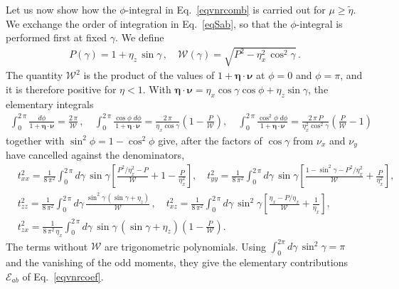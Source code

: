 \documentclass[aps,prb,onecolumn,nofootinbib,citeautoscript,10pt]{revtex4-2}
\newcommand{\bs}[1]{\boldsymbol{#1}}
\def \nn{\nonumber \\}
\begin{document}
Let us now show how the $\phi$-integral in Eq.~\eqref{eqvnrcomb} is carried out for $\mu\ge\tilde\eta$. We exchange the order of integration in Eq.~\eqref{eqSab}, so that the $\phi$-integral is performed first at fixed $\gamma$. We define
\begin{align}
P(\gamma)=1+\eta_z\,\sin\gamma\,, \quad \mathcal W(\gamma)=\sqrt{P^2-\eta_x^2\,\cos^2\gamma}\,.
\end{align}
The quantity $\mathcal W^2$ is the product of the values of $1+\bs\eta\cdot\bs\nu$ at $\phi=0$ and $\phi=\pi$, and it is therefore positive for $\eta<1$. With $\bs\eta\cdot\bs\nu=\eta_x\cos\gamma\cos\phi+\eta_z\sin\gamma$, the elementary integrals
\begin{align}
\int_0^{2\,\pi}\frac{d\phi}{1+\bs\eta\cdot\bs\nu}=\frac{2\,\pi}{\mathcal W}\,, \quad
\int_0^{2\,\pi}\frac{\cos\phi\;d\phi}{1+\bs\eta\cdot\bs\nu}=\frac{2\,\pi}{\eta_x\cos\gamma}\left(1-\frac{P}{\mathcal W}\right), \quad
\int_0^{2\,\pi}\frac{\cos^2\phi\;d\phi}{1+\bs\eta\cdot\bs\nu}=\frac{2\,\pi\,P}{\eta_x^2\cos^2\gamma}\left(\frac{P}{\mathcal W}-1\right)
\end{align}
together with $\sin^2\phi=1-\cos^2\phi$ give, after the factors of $\cos\gamma$ from $\nu_x$ and $\nu_y$ have cancelled against the denominators,
\begin{align}
\label{eqvnrgamma}
& t^2_{xx}=\frac{1}{8\,\pi^2}\int_0^{2\,\pi}d\gamma\,\sin\gamma \left[\frac{P^2/\eta_x^2-P}{\mathcal W}+1-\frac{P}{\eta_x^2}\right], \quad
t^2_{yy}=\frac{1}{8\,\pi^2}\int_0^{2\,\pi}d\gamma\,\sin\gamma \left[\frac{1-\sin^2\gamma-P^2/\eta_x^2}{\mathcal W}+\frac{P}{\eta_x^2}\right], \nn &
t^2_{zz}=\frac{1}{8\,\pi^2}\int_0^{2\,\pi}d\gamma\,\frac{\sin^2\gamma\,(\sin\gamma+\eta_z)}{\mathcal W}\,, \quad
t^2_{xz}=\frac{1}{8\,\pi^2}\int_0^{2\,\pi}d\gamma\,\sin^2\gamma \left[\frac{\eta_x-P/\eta_x}{\mathcal W}+\frac{1}{\eta_x}\right], \nn &
t^2_{zx}=\frac{1}{8\,\pi^2\,\eta_x}\int_0^{2\,\pi}d\gamma\,\sin\gamma\,(\sin\gamma+\eta_z)\left(1-\frac{P}{\mathcal W}\right).
\end{align}
The terms without $\mathcal W$ are trigonometric polynomials. Using $\int_0^{2\pi}d\gamma\,\sin^2\gamma=\pi$ and the vanishing of the odd moments, they give the elementary contributions $\mathcal E_{ab}$ of Eq.~\eqref{eqvnrcoef}.
\end{document}
